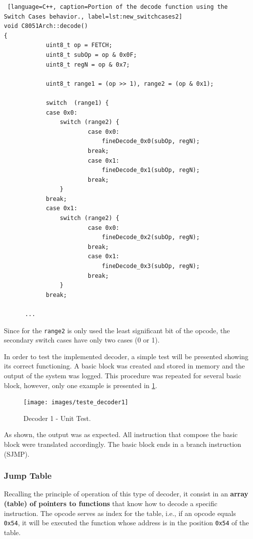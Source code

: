 \begin{lstlisting} [language=C++, caption=Portion of the decode function using the Switch Cases behavior., label=lst:new_switchcases2]
void C8051Arch::decode()
{
			uint8_t op = FETCH;
			uint8_t subOp = op & 0x0F;
			uint8_t regN = op & 0x7;
	
			uint8_t range1 = (op >> 1), range2 = (op & 0x1);

			switch  (range1) {
			case 0x0:
	  			switch (range2) {
	  					case 0x0:
	    					fineDecode_0x0(subOp, regN);
	    				break;
	  					case 0x1:
	    					fineDecode_0x1(subOp, regN);
	   					break;
	  			}
			break;
			case 0x1:
	  			switch (range2) {
	  					case 0x0:
	    					fineDecode_0x2(subOp, regN);
	    				break;
	  					case 0x1:
	    					fineDecode_0x3(subOp, regN);
	    				break;
	  			}
			break;
            
	  ...
\end{lstlisting}

Since for the \texttt{range2} is only used the least significant bit of the opcode, the secondary switch cases have only two cases (0 or 1).	 


In order to test the implemented decoder, a simple test will be presented showing its correct functioning. A basic block was created and stored in memory and the output of the system was logged. This procedure was repeated for several basic block, however, only one example is presented in \ref{fig:teste1_decoder}.   


\begin{figure}[H]
\centerline{
\texttt{[image: images/teste\_decoder1]}
}
\caption{Decoder 1 - Unit Test.}
\label{fig:teste1_decoder} 
\end{figure}

As shown, the output was as expected. All instruction that compose the basic block were translated accordingly. The basic block ends in a branch instruction (SJMP).

\subsubsection{Jump Table}

Recalling the principle of operation of this type of decoder, it consist in an \textbf{array (table) of pointers to functions} that know how to decode a specific instruction. The opcode serves as index for the table, i.e., if an opcode equals \texttt{0x54}, it will be executed the function whose address is in the position \texttt{0x54} of the table. 


